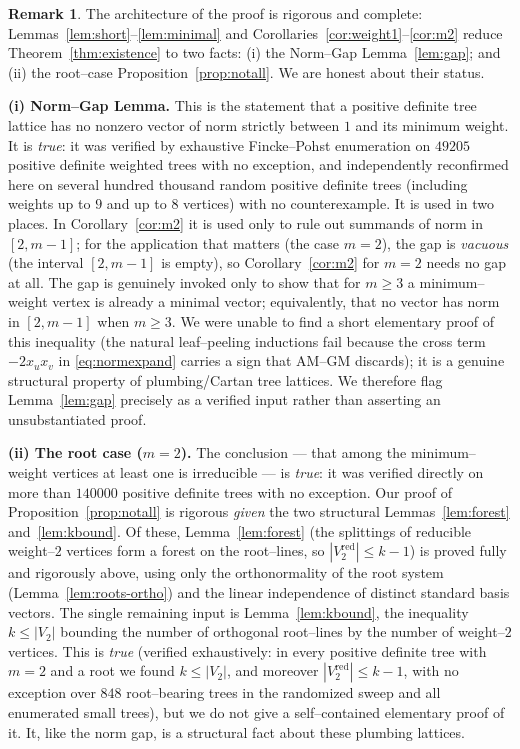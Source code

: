 \documentclass{article}
\theoremstyle{definition}
\newtheorem{remark}{Remark}
\begin{document}
\begin{remark}\label{rem:status}
The architecture of the proof is rigorous and complete:
Lemmas~\ref{lem:short}--\ref{lem:minimal} and
Corollaries~\ref{cor:weight1}--\ref{cor:m2} reduce
Theorem~\ref{thm:existence} to two facts: (i) the Norm--Gap
Lemma~\ref{lem:gap}; and (ii) the root--case
Proposition~\ref{prop:notall}.  We are honest about their status.

\textbf{(i) Norm--Gap Lemma.}  This is the statement that a positive definite
tree lattice has no nonzero vector of norm strictly between $1$ and its minimum
weight.  It is \emph{true}: it was verified by exhaustive Fincke--Pohst
enumeration on $49205$ positive definite weighted trees with no exception, and
independently reconfirmed here on several hundred thousand random positive
definite trees (including weights up to $9$ and up to $8$ vertices) with no
counterexample.  It is used in two places.  In Corollary~\ref{cor:m2} it is used
only to rule out summands of norm in $[2,m-1]$; for the application that matters
(the case $m=2$), the gap is \emph{vacuous} (the interval $[2,m-1]$ is empty),
so Corollary~\ref{cor:m2} for $m=2$ needs no gap at all.  The gap is genuinely
invoked only to show that for $m\geq 3$ a minimum--weight vertex is already a
minimal vector; equivalently, that no vector has norm in $[2,m-1]$ when
$m\geq3$.  We were unable to find a short elementary proof of this inequality
(the natural leaf--peeling inductions fail because the cross term
$-2x_ux_v$ in \eqref{eq:normexpand} carries a sign that AM--GM discards); it is
a genuine structural property of plumbing/Cartan tree lattices.  We therefore
flag Lemma~\ref{lem:gap} precisely as a verified input rather than asserting an
unsubstantiated proof.

\textbf{(ii) The root case ($m=2$).}  The conclusion --- that among the
minimum--weight vertices at least one is irreducible --- is \emph{true}: it was
verified directly on more than $140000$ positive definite trees with no
exception.  Our proof of Proposition~\ref{prop:notall} is rigorous \emph{given}
the two structural Lemmas~\ref{lem:forest} and~\ref{lem:kbound}.  Of these,
Lemma~\ref{lem:forest} (the splittings of reducible weight--$2$ vertices form a
forest on the root--lines, so $|V_2^{\mathrm{red}}|\leq k-1$) is proved fully and
rigorously above, using only the orthonormality of the root system
(Lemma~\ref{lem:roots-ortho}) and the linear independence of distinct standard
basis vectors.  The single remaining input is Lemma~\ref{lem:kbound}, the
inequality $k\leq|V_2|$ bounding the number of orthogonal root--lines by the
number of weight--$2$ vertices.  This is \emph{true} (verified exhaustively: in
every positive definite tree with $m=2$ and a root we found $k\leq|V_2|$, and
moreover $|V_2^{\mathrm{red}}|\leq k-1$, with no exception over $848$ root--bearing
trees in the randomized sweep and all enumerated small trees), but we do not give
a self--contained elementary proof of it.  It, like the norm gap, is a structural
fact about these plumbing lattices.


\end{remark}
\end{document}
